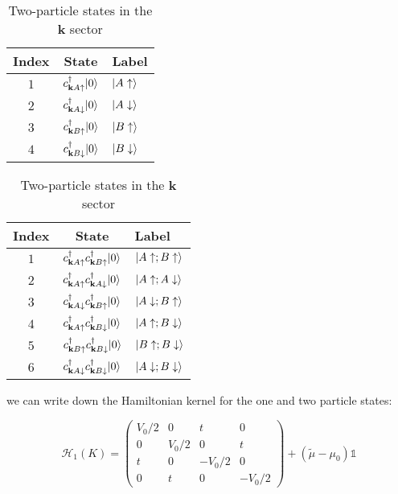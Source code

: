 \documentclass[12pt]{article}
\DeclarePairedDelimiter\ket{\lvert}{\rangle}%
\numberwithin{equation}{section}
\begin{document}
\begin{table}[h]
\centering
\begin{minipage}{0.48\textwidth}
\centering
\begin{tabular}{c c l}
\hline\hline
Index & State & Label \\
\hline
$1$ & $c^\dagger_{\mathbf{k}A\uparrow}\ket{0}$ & $\ket{A\uparrow}$ \\
$2$ & $c^\dagger_{\mathbf{k}A\downarrow}\ket{0}$ & $\ket{A\downarrow}$ \\
$3$ & $c^\dagger_{\mathbf{k}B\uparrow}\ket{0}$ & $\ket{B\uparrow}$ \\
$4$ & $c^\dagger_{\mathbf{k}B\downarrow}\ket{0}$ & $\ket{B\downarrow}$ \\
\hline
\end{tabular}
\caption{Single-particle states in the $\mathbf{k}$ sector}
\label{tab:single_particle_states}
\end{minipage}
\hfill
\begin{minipage}{0.48\textwidth}
\centering
\begin{tabular}{c c l}
\hline\hline
Index & State & Label \\
\hline
$1$ & $c^\dagger_{\mathbf{k}A\uparrow}c^\dagger_{\mathbf{k}B\uparrow}\ket{0}$ & $\ket{A\uparrow; B\uparrow}$ \\
$2$ & $c^\dagger_{\mathbf{k}A\uparrow}c^\dagger_{\mathbf{k}A\downarrow}\ket{0}$ & $\ket{A\uparrow; A\downarrow}$ \\
$3$ & $c^\dagger_{\mathbf{k}A\downarrow}c^\dagger_{\mathbf{k}B\uparrow}\ket{0}$ & $\ket{A\downarrow; B\uparrow}$ \\
$4$ & $c^\dagger_{\mathbf{k}A\uparrow}c^\dagger_{\mathbf{k}B\downarrow}\ket{0}$ & $\ket{A\uparrow; B\downarrow}$ \\
$5$ & $c^\dagger_{\mathbf{k}B\uparrow}c^\dagger_{\mathbf{k}B\downarrow}\ket{0}$ & $\ket{B\uparrow; B\downarrow}$ \\
$6$ & $c^\dagger_{\mathbf{k}A\downarrow}c^\dagger_{\mathbf{k}B\downarrow}\ket{0}$ & $\ket{A\downarrow; B\downarrow}$ \\
\hline
\end{tabular}
\caption{Two-particle states in the $\mathbf{k}$ sector}
\label{tab:two_particle_states}
\end{minipage}
\end{table}
we can write down the Hamiltonian kernel for the one and two particle states:

\begin{equation}
\mathcal{H}_1(K)=
\begin{pmatrix}
V_0/2 & 0 &t& 0\\
0 & V_0/2 &0&t\\
t & 0 & -V_0/2&0\\
0 & t &0 &-V_0/2
\end{pmatrix}
+(\tilde \mu-\mu_0)\mathds{1}
\end{equation}
\end{document}
